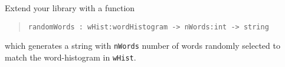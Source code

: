\label{randomWords}
Extend your library with a function
\begin{quote}
  \mbox{\lstinline!randomWords : wHist:wordHistogram -> nWords:int -> string!}
\end{quote}
which generates a string with \lstinline!nWords! number of words
randomly selected to match the word-histogram in
\lstinline!wHist!.
